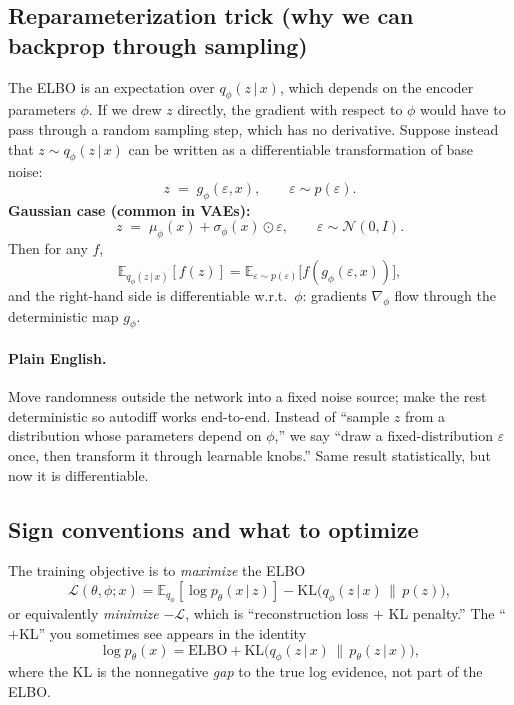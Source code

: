 \documentclass[11pt]{article}
\newcommand{\E}{\mathbb{E}}
\newcommand{\KL}{\mathrm{KL}}
\newcommand{\given}{\,\vert\,}
\theoremstyle{remark}
\begin{document}
\subsection{Reparameterization trick (why we can backprop through sampling)}
The ELBO is an expectation over $q_\phi(z\given x)$, which depends on the encoder parameters $\phi$. If we drew $z$ directly, the gradient with respect to $\phi$ would have to pass through a random sampling step, which has no derivative. Suppose instead that $z\sim q_\phi(z\given x)$ can be written as a differentiable transformation of base noise:
\[
z \;=\; g_\phi(\varepsilon,x),\qquad \varepsilon\sim p(\varepsilon).
\]
\textbf{Gaussian case (common in VAEs):}
\[
z \;=\; \mu_\phi(x) + \sigma_\phi(x)\odot \varepsilon,\qquad \varepsilon\sim\mathcal N(0,I).
\]
Then for any $f$,
\[
\E_{q_\phi(z\given x)}[f(z)]
= \E_{\varepsilon\sim p(\varepsilon)}\!\big[f(g_\phi(\varepsilon,x))\big],
\]
and the right-hand side is differentiable w.r.t.\ $\phi$: gradients $\nabla_\phi$ flow through the deterministic map $g_\phi$.

\paragraph{Plain English.} Move randomness outside the network into a fixed noise source; make the rest deterministic so autodiff works end-to-end. Instead of ``sample $z$ from a distribution whose parameters depend on $\phi$,'' we say ``draw a fixed-distribution $\varepsilon$ once, then transform it through learnable knobs.'' Same result statistically, but now it is differentiable.

\subsection{Sign conventions and what to optimize}
The training objective is to \emph{maximize} the ELBO
\[
\mathcal L(\theta,\phi;x)
= \E_{q_\phi}[\log p_\theta(x\given z)]
- \KL\!\big(q_\phi(z\given x)\,\|\,p(z)\big),
\]
or equivalently \emph{minimize} $-\mathcal L$, which is ``reconstruction loss $+$ KL penalty.'' The ``$+$\;KL'' you sometimes see appears in the identity
\[
\log p_\theta(x)=\text{ELBO}+\KL\!\big(q_\phi(z\given x)\,\|\,p_\theta(z\given x)\big),
\]
where the KL is the nonnegative \emph{gap} to the true log evidence, not part of the ELBO.
\end{document}
